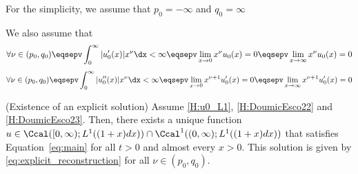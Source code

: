 For the simplicity, we assume that 
$ p_0=-\infty$ and $q_0 = \infty$

We also assume that 
\begin{equation}
    \forall \nu \in (p_0, q_0) 
    \eqsepv
    \int_0^\infty |u_0'(x)| x^\nu \dx < \infty
    \eqsepv
    \lim_{x \to 0} x^\nu u_0(x) = 0
    \eqsepv
    \lim_{x \to \infty} x^\nu u_0(x) = 0
    \label{H:DoumicEsco22}
\end{equation}
\begin{equation}
    \forall \nu \in (p_0, q_0) 
    \eqsepv
    \int_0^\infty |u_0''(x)| x^\nu \dx < \infty
    \eqsepv
    \lim_{x \to 0} x^{\nu + 1} u_0'(x) = 0
    \eqsepv
    \lim_{x \to \infty} x^{\nu + 1} u_0'(x) = 0
    \label{H:DoumicEsco23}
\end{equation}

\begin{theorem}(Existence of an explicit solution) Assume \eqref{H:u0_L1}, \eqref{H:DoumicEsco22} and \eqref{H:DoumicEsco23}.
    Then, there exists a unique function $u \in \Ccal([0, \infty); L^1((1+x)dx)) \cap \Ccal^1((0, \infty); L^1((1+x)dx))$ that satisfies Equation~\eqref{eq:main} for all $t > 0$ and almost every $x > 0$. This solution is given by \eqref{eq:explicit_reconstruction} for all $\nu \in (p_0, q_0)$.
    \end{theorem}
